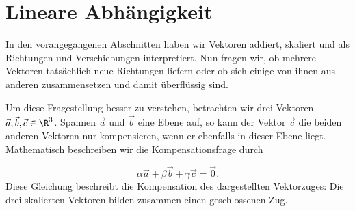 \section{Lineare Abhängigkeit}
\label{sec:vector_algebra_linear_dependence}

In den vorangegangenen Abschnitten haben wir Vektoren addiert, skaliert und
als Richtungen und Verschiebungen interpretiert. Nun fragen wir, ob mehrere
Vektoren tatsächlich neue Richtungen liefern oder ob sich einige von ihnen aus
anderen zusammensetzen und damit überflüssig sind.

\bigskip

Um diese Fragestellung besser zu verstehen, betrachten wir drei Vektoren
$\vec a,\vec b,\vec c\in\R^3$. Spannen $\vec a$ und $\vec b$ eine Ebene auf,
so kann der Vektor $\vec c$ die beiden anderen Vektoren nur kompensieren,
wenn er ebenfalls in dieser Ebene liegt. Mathematisch beschreiben wir die
Kompensationsfrage durch

\noindent
\begin{minipage}[c]{0.55\linewidth}
  \[
    \alpha\vec a+\beta\vec b+\gamma\vec c=\vec 0.
  \]
  Diese Gleichung beschreibt die Kompensation des dargestellten Vektorzuges:
  Die drei skalierten Vektoren bilden zusammen einen geschlossenen Zug.
\end{minipage}\hfill
\begin{minipage}[c]{0.40\linewidth}
  \centering
\end{minipage}

